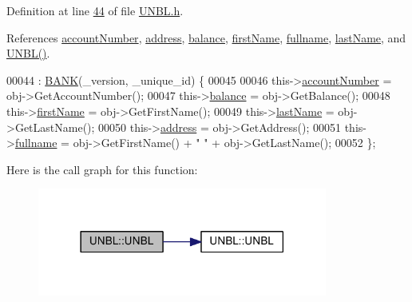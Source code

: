 Definition at line \hyperlink{_u_n_b_l_8h_source_l00044}{44} of file \hyperlink{_u_n_b_l_8h_source}{U\+N\+B\+L.\+h}.



References \hyperlink{_u_n_b_l_8h_source_l00093}{account\+Number}, \hyperlink{_u_n_b_l_8h_source_l00095}{address}, \hyperlink{_u_n_b_l_8h_source_l00094}{balance}, \hyperlink{_u_n_b_l_8h_source_l00091}{first\+Name}, \hyperlink{_u_n_b_l_8h_source_l00090}{fullname}, \hyperlink{_u_n_b_l_8h_source_l00092}{last\+Name}, and \hyperlink{_u_n_b_l_8h_source_l00022}{U\+N\+B\+L()}.


\begin{DoxyCode}
00044                                                                 : \hyperlink{class_b_a_n_k_a0bc938356cebff14fb0560264abe5a34_a0bc938356cebff14fb0560264abe5a34}{BANK}(\_version, \_unique\_id) \{
00045  
00046         this->\hyperlink{class_u_n_b_l_a90763c3044159862bcb9cd51d6b09f34_a90763c3044159862bcb9cd51d6b09f34}{accountNumber} = obj->GetAccountNumber();
00047         this->\hyperlink{class_u_n_b_l_afbe674996d7fddaffb55654e6a79f03b_afbe674996d7fddaffb55654e6a79f03b}{balance} = obj->GetBalance();
00048         this->\hyperlink{class_u_n_b_l_acee1595bf1914ac220f7c810b174bd16_acee1595bf1914ac220f7c810b174bd16}{firstName} = obj->GetFirstName();
00049         this->\hyperlink{class_u_n_b_l_a3f42790177cbe310536f53a7369ee194_a3f42790177cbe310536f53a7369ee194}{lastName} = obj->GetLastName();
00050         this->\hyperlink{class_u_n_b_l_acdaf39211e9b9c190a69bbbc590543e3_acdaf39211e9b9c190a69bbbc590543e3}{address} = obj->GetAddress();
00051         this->\hyperlink{class_u_n_b_l_a67deb62f553fe1ece6feb73f12898e7a_a67deb62f553fe1ece6feb73f12898e7a}{fullname} = obj->GetFirstName() + \textcolor{stringliteral}{" "} + obj->GetLastName();
00052     \};
\end{DoxyCode}


Here is the call graph for this function\+:
\nopagebreak
\begin{figure}[H]
\begin{center}
\leavevmode
\includegraphics[width=270pt]{class_u_n_b_l_abbd578fbd58cf6f2143f17b3011f6c21_abbd578fbd58cf6f2143f17b3011f6c21_cgraph}
\end{center}
\end{figure}


